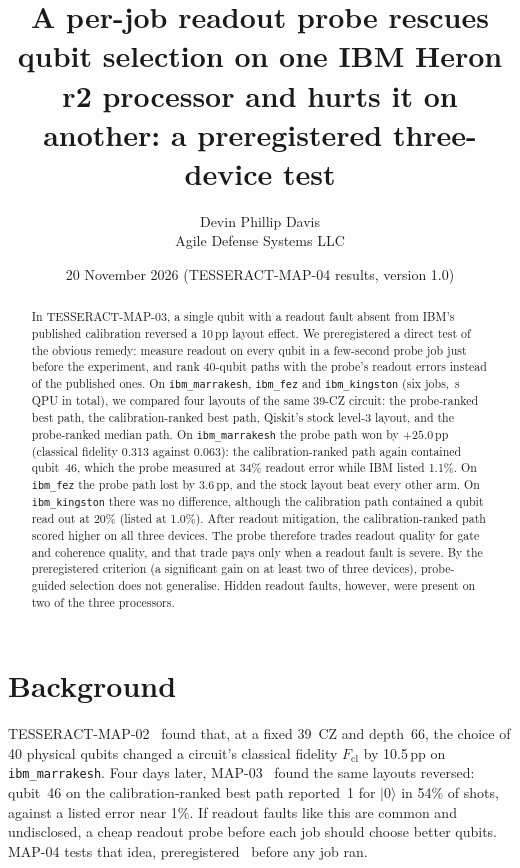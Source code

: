 \documentclass[10pt,twocolumn]{article}
\title{\bfseries A per-job readout probe rescues qubit selection on one IBM Heron r2 processor and
hurts it on another: a preregistered three-device test}
\author{Devin Phillip Davis\\ \small Agile Defense Systems LLC}
\date{20 November 2026 \quad (TESSERACT-MAP-04 results, version 1.0)}
\begin{document}
\maketitle

\begin{abstract}
\noindent
In TESSERACT-MAP-03, a single qubit with a readout fault absent from IBM's published calibration
reversed a 10\,pp layout effect. We preregistered a direct test of the obvious remedy: measure readout
on every qubit in a few-second probe job just before the experiment, and rank 40-qubit paths with the
probe's readout errors instead of the published ones. On \texttt{ibm\_marrakesh}, \texttt{ibm\_fez}
and \texttt{ibm\_kingston} (six jobs, \TotalSeconds{}\,s QPU in total), we compared four layouts of the
same 39-CZ circuit: the probe-ranked best path, the calibration-ranked best path, Qiskit's stock
level-3 layout, and the probe-ranked median path. On \texttt{ibm\_marrakesh} the probe path won by
$+25.0$\,pp (classical fidelity 0.313 against 0.063): the calibration-ranked path again contained
qubit~46, which the probe measured at 34\% readout error while IBM listed 1.1\%. On \texttt{ibm\_fez}
the probe path lost by 3.6\,pp, and the stock layout beat every other arm. On \texttt{ibm\_kingston}
there was no difference, although the calibration path contained a qubit read out at 20\% (listed at
1.0\%). After readout mitigation, the calibration-ranked path scored higher on all three devices. The
probe therefore trades readout quality for gate and coherence quality, and that trade pays only when
a readout fault is severe. By the preregistered criterion (a significant gain on at least two of three
devices), probe-guided selection does not generalise. Hidden readout faults, however, were present on
two of the three processors.
\end{abstract}

\section{Background}
TESSERACT-MAP-02~\cite{map02} found that, at a fixed 39~CZ and depth~66, the choice of 40 physical
qubits changed a circuit's classical fidelity $F_{\mathrm{cl}}$ by 10.5\,pp on \texttt{ibm\_marrakesh}.
Four days later, MAP-03~\cite{map03} found the same layouts reversed: qubit~46 on the
calibration-ranked best path reported~1 for $|0\rangle$ in 54\% of shots, against a listed error near
1\%. If readout faults like this are common and undisclosed, a cheap readout probe before each job
should choose better qubits. MAP-04 tests that idea, preregistered~\cite{prereg} before any job ran.
\end{document}
